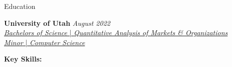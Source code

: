 \documentclass{resume/resume}
\begin{document}
\begin{rSection}{Education}

{\bf University of Utah} \hfill {\em August 2022}
\vspace{2pt}
  \\ \href{https://eccles.utah.edu/programs/undergraduate/academics/majors/qamo/}{{\em Bachelors of Science} | {\em Quantitative Analysis of Markets \& Organizations}
  }
  \\ \href{https://github.com/search?o=desc&q=user\%3ASpelkington&s=updated&type=Repositories}{{\em Minor} | {\em Computer Science}}

%
%
%
%
%
%
%   
%
%
%
%

%
%
{\bf Key Skills:}
\vspace{-1.83em}


\end{rSection}
\end{document}
